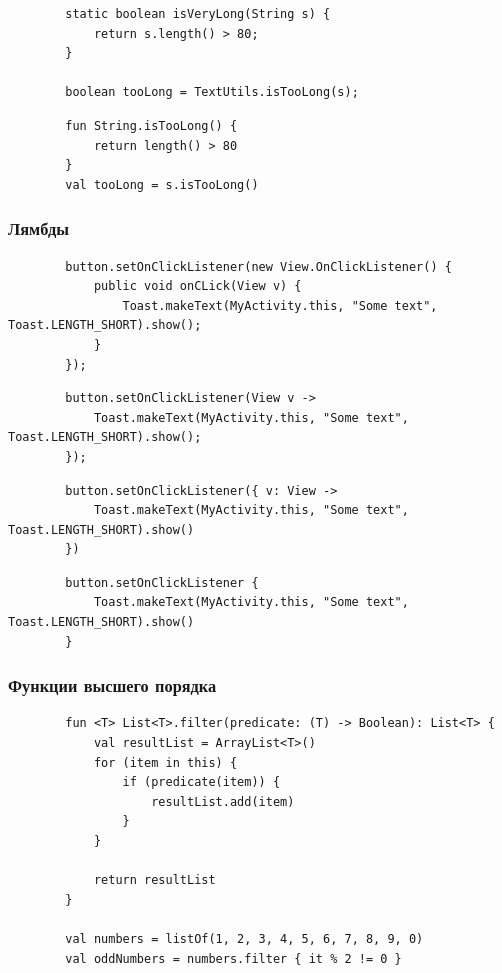 \documentclass{beamer}
\begin{document}
\begin{frame}[fragile, t]
    \begin{verbatim}
        static boolean isVeryLong(String s) {
            return s.length() > 80;
        }

        boolean tooLong = TextUtils.isTooLong(s);
    \end{verbatim}
    \begin{verbatim}
        fun String.isTooLong() {
            return length() > 80
        }
        val tooLong = s.isTooLong()
    \end{verbatim}
\end{frame}

\begin{frame}[fragile, t]
    \frametitle{Лямбды}
    \begin{verbatim}
        button.setOnClickListener(new View.OnClickListener() {
            public void onCLick(View v) {
                Toast.makeText(MyActivity.this, "Some text", Toast.LENGTH_SHORT).show();
            }
        });
    \end{verbatim}

    \begin{verbatim}
        button.setOnClickListener(View v ->
            Toast.makeText(MyActivity.this, "Some text", Toast.LENGTH_SHORT).show();
        });
    \end{verbatim}

    \begin{verbatim}
        button.setOnClickListener({ v: View ->
            Toast.makeText(MyActivity.this, "Some text", Toast.LENGTH_SHORT).show()
        })
    \end{verbatim}

    \begin{verbatim}
        button.setOnClickListener {
            Toast.makeText(MyActivity.this, "Some text", Toast.LENGTH_SHORT).show()
        }
    \end{verbatim}
\end{frame}


\begin{frame}[fragile, t]
    \frametitle{Функции высшего порядка}
    \begin{verbatim}
        fun <T> List<T>.filter(predicate: (T) -> Boolean): List<T> {
            val resultList = ArrayList<T>()
            for (item in this) {
                if (predicate(item)) {
                    resultList.add(item)
                }
            }

            return resultList
        }

        val numbers = listOf(1, 2, 3, 4, 5, 6, 7, 8, 9, 0)
        val oddNumbers = numbers.filter { it % 2 != 0 }
    \end{verbatim}
\end{frame}
\end{document}
